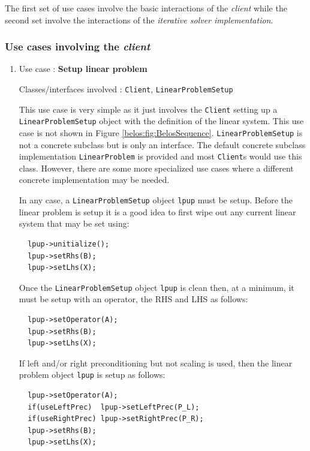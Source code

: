 \documentclass[pdf,ps2pdf,11pt]{SANDreport}
\begin{document}
The first set of use cases involve the basic interactions of the
{}\textit{client} while the second set involve the interactions of the
{}\textit{iterative solver implementation}.

\subsubsection*{Use cases involving the {}\textit{client}}

\begin{enumerate}

\item Use case : \textbf{Setup linear problem}

{}\noindent{}Classes/interfaces involved : {}\texttt{Client},
{}\texttt{Linear\-Problem\-Setup}

This use case is very simple as it just involves the {}\texttt{Client}
setting up a {}\texttt{Linear\-Problem\-Setup} object with the
definition of the linear system.  This use case is not shown in Figure
{}\ref{belos:fig:BelosSequence}.  {}\texttt{Linear\-Problem\-Setup} is
not a concrete subclass but is only an interface.  The default
concrete subclass implementation {}\texttt{Linear\-Problem} is
provided and most {}\texttt{Client}s would use this class.  However,
there are some more specialized use cases where a different concrete
implementation may be needed.

In any case, a {}\texttt{Linear\-Problem\-Setup} object
{}\texttt{lpup} must be setup.  Before the linear problem is setup
it is a good idea to first wipe out any current linear system that
may be set using:

{\scriptsize\begin{verbatim}
  lpup->unitialize();
  lpup->setRhs(B);
  lpup->setLhs(X);
\end{verbatim}}

Once the {}\texttt{Linear\-Problem\-Setup} object {}\texttt{lpup} is
clean then, at a minimum, it must be setup with an operator, the RHS
and LHS as follows:

{\scriptsize\begin{verbatim}
  lpup->setOperator(A);
  lpup->setRhs(B);
  lpup->setLhs(X);
\end{verbatim}}

If left and/or right preconditioning but not scaling is used, then the
linear problem object {}\texttt{lpup} is setup as follows:

{\scriptsize\begin{verbatim}
  lpup->setOperator(A);
  if(useLeftPrec)  lpup->setLeftPrec(P_L);
  if(useRightPrec) lpup->setRightPrec(P_R);
  lpup->setRhs(B);
  lpup->setLhs(X);
\end{verbatim}}


\end{enumerate}
\end{document}

